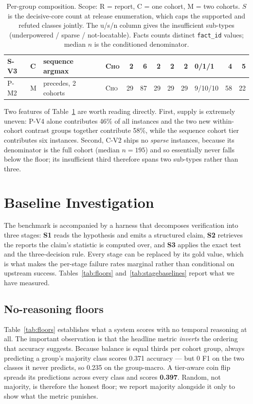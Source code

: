 \begin{table}[t]
\begin{tabular}{llllrrrrrlrr}
S-V3 & C & sequence argmax & \textsc{Cho} & 2 & 6 & 2 & 2 & 2 & 0/1/1 & 4 & 5 \\
\midrule
P-M2 & M & precedes, 2 cohorts & \textsc{Cho} & 29 & 87 & 29 & 29 & 29 & 9/10/10 & 58 & 22 \\
\bottomrule
\end{tabular}
\caption{Per-group composition. Scope: R = report, C = one cohort, M = two
cohorts. $S$ is the decisive-core count at release enumeration, which caps the
supported and refuted classes jointly. The u/s/n column gives the insufficient
sub-types (underpowered / sparse / not-locatable). Facts counts distinct
\texttt{fact\_id} values; median $n$ is the conditioned denominator.}
\label{tab:pergroup}
\end{table}

Two features of Table~\ref{tab:pergroup} are worth reading directly. First,
supply is extremely uneven: P-V4 alone contributes 46\% of all instances and the
two new within-cohort contrast groups together contribute 58\%, while the
sequence cohort tier contributes six instances. Second, C-V2 ships no
\emph{sparse} instances, because its denominator is the full cohort (median
$n = 195$) and so essentially never falls below the floor; its insufficient third
therefore spans two sub-types rather than three.

\section{Baseline Investigation}
\label{sec:baselines}

The benchmark is accompanied by a harness that decomposes verification into
three stages: \textbf{S1} reads the hypothesis and emits a structured claim,
\textbf{S2} retrieves the reports the claim's statistic is computed over, and
\textbf{S3} applies the exact test and the three-decision rule. Every stage can
be replaced by its gold value, which is what makes the per-stage failure rates
marginal rather than conditional on upstream success. Tables~\ref{tab:floors}
and~\ref{tab:stagebaselines} report what we have measured.

\subsection{No-reasoning floors}

Table~\ref{tab:floors} establishes what a system scores with no temporal
reasoning at all. The important observation is that the headline metric
\emph{inverts} the ordering that accuracy suggests. Because balance is equal
thirds per cohort group, always predicting a group's majority class scores
0.371 accuracy --- but 0 F1 on the two classes it never predicts, so 0.235 on
the group-macro. A tier-aware coin flip spreads its predictions across every
class and scores \textbf{0.397}. Random, not majority, is therefore the honest
floor; we report majority alongside it only to show what the metric punishes.

